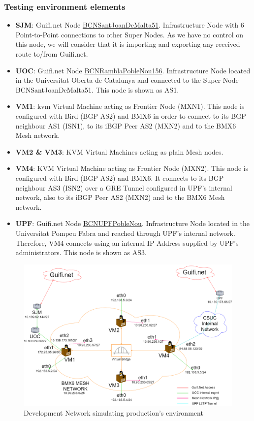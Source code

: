 \subsubsection{Testing environment elements}
\begin{itemize}
    \item \textbf{SJM}: Guifi.net Node  \href{https://guifi.net/en/node/20262/}{BCNSantJoanDeMalta51}. Infrastructure Node with 6 Point-to-Point connections to other Super Nodes. As we have no control on this node, we will consider that it is importing and exporting any received route to/from Guifi.net.
    \item \textbf{UOC}: Guifi.net Node \href{https://guifi.net/en/node/63255}{BCNRamblaPobleNou156}. Infrastructure Node located in the Universitat Oberta de Catalunya and connected to the Super Node BCNSantJoanDeMalta51. This node is shown as AS1.
    \item \textbf{VM1}: \acrshort{kvm} Virtual Machine acting as Frontier Node (MXN1). This node is configured with Bird (BGP AS2) and BMX6 in order to connect to its BGP neighbour AS1 (ISN1), to its iBGP Peer AS2 (MXN2) and to the BMX6 Mesh network.
    \item \textbf{VM2 \& VM3}: KVM Virtual Machines acting as plain Mesh nodes.
    \item \textbf{VM4}: KVM Virtual Machine acting as Frontier Node (MXN2). This node is configured with Bird (BGP AS2) and BMX6. It connects to its BGP neighbour AS3 (ISN2) over a GRE Tunnel configured in UPF's internal network, also to its iBGP Peer AS2 (MXN2) and to the BMX6 Mesh network.
    \item \textbf{UPF}: Guifi.net Node \href{https://guifi.net/en/node/56604}{BCNUPFPobleNou}. Infrastructure Node located in the Universitat Pompeu Fabra and reached through UPF's internal network. Therefore, VM4 connects using an internal IP Address supplied by UPF's administrators. This node is shown as AS3.
\end{itemize}


\begin{landscape}
\begin{figure}[ht!]
    \centering
    \includegraphics[width=\hsize]{images/devnetfull}
    \caption{Development Network simulating production's environment}
    \label{fig:devnet}
\end{figure}
\end{landscape}
\newpage

